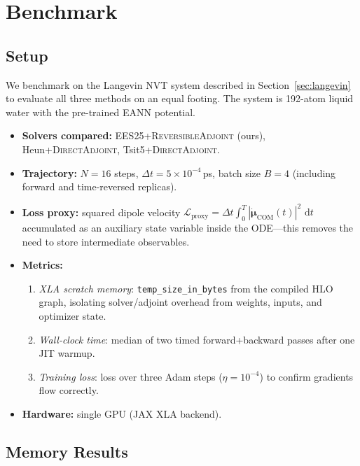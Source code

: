 \documentclass{article}
\newcommand{\dd}{\,\mathrm{d}}
\newcommand{\EES}{\textsc{EES25}}
\newcommand{\RevAdj}{\textsc{ReversibleAdjoint}}
\newcommand{\EANN}{\textsc{EANN}}
\begin{document}
\section{Benchmark}
\label{sec:benchmark}

\subsection{Setup}

We benchmark on the Langevin NVT system described in Section~\ref{sec:langevin}
to evaluate all three methods on an equal footing.  The system is 192-atom
liquid water with the pre-trained \EANN{} potential.

\begin{itemize}
  \item \textbf{Solvers compared:}
    \EES{}+\RevAdj{} (ours),
    Heun+\textsc{DirectAdjoint},
    Tsit5+\textsc{DirectAdjoint}.
  \item \textbf{Trajectory:} $N = 16$ steps, $\Delta t = 5\times10^{-4}$\,ps,
    batch size $B = 4$ (including forward and time-reversed replicas).
  \item \textbf{Loss proxy:} squared dipole velocity
    $\mathcal{L}_\mathrm{proxy} = \Delta t\int_0^T |\dot{\bm{\mu}}_\mathrm{COM}(t)|^2\,\dd t$
    accumulated as an auxiliary state variable inside the ODE---this
    removes the need to store intermediate observables.
  \item \textbf{Metrics:}
    \begin{enumerate}
      \item \emph{XLA scratch memory}: \texttt{temp\_size\_in\_bytes} from the
        compiled \textsc{HLO} graph, isolating solver/adjoint overhead from
        weights, inputs, and optimizer state.
      \item \emph{Wall-clock time}: median of two timed forward+backward passes
        after one JIT warmup.
      \item \emph{Training loss}: loss over three Adam steps ($\eta = 10^{-4}$)
        to confirm gradients flow correctly.
    \end{enumerate}
  \item \textbf{Hardware:} single GPU (JAX XLA backend).
\end{itemize}

\subsection{Memory Results}
\end{document}
